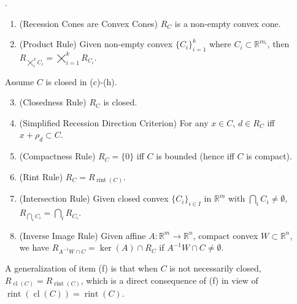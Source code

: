 \begin{prop}.
	\label{prop:013-yoga-recession}
	\begin{enumerate}[label=(\alph*)]
		\item (Recession Cones are Convex Cones) $R_C$ is a non-empty convex cone.
		\item (Product Rule) Given non-empty convex $\{C_i\}_{i=1}^k$ where $C_i\subset \mathbb{R}^{m_i}$, then $R_{\bigtimes_i^kC_i}=\bigtimes_{i=1}^kR_{C_i}$.
	\end{enumerate}
	Assume $C$ is closed in (c)-(h).
	\begin{enumerate}[label=(\alph*)]
		\setcounter{enumi}{2}
		\item (Closedness Rule) $R_C$ is closed.
		\item (Simplified Recession Direction Criterion) For any $x\in C$, $d\in R_C$ iff $x+\rho_d\subset C$.
		\item (Compactness Rule) $R_C=\{0\}$ iff $C$ is bounded (hence iff $C$ is compact).
		\item (Rint Rule) $R_C=R_{\operatorname{rint}(C)}$.
		\item (Intersection Rule) Given closed convex $\{C_i\}_{i\in I}$ in $\mathbb{R}^m$ with $\bigcap_i{C_i}\neq\emptyset$, $R_{\bigcap_iC_i}=\bigcap_iR_{C_i}$.
		\item (Inverse Image Rule) Given affine $A:\mathbb{R}^m\to \mathbb{R}^n$, compact convex $W\subset \mathbb{R}^n$,\\we have $R_{A^{-1}W\cap C}=\operatorname{ker}(A)\cap R_C$ if $A^{-1}W\cap C\neq\emptyset$.
	\end{enumerate}
\end{prop}

\begin{rmrk}
	A generalization of item (f) is that when $C$ is not necessarily closed, $R_{\operatorname{cl}(C)}=R_{\operatorname{rint}(C)}$, which is a direct consequence of (f) in view of $\operatorname{rint}(\operatorname{cl}(C))=\operatorname{rint}(C)$.
\end{rmrk}

